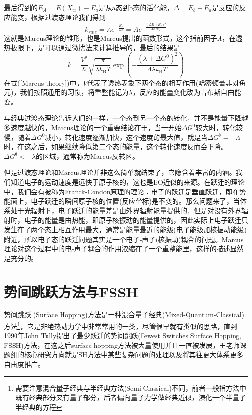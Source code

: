 \documentclass[12pt,a4paper,openany,twoside]{book}
\numberwithin{equation}{section}
\begin{document}
        最后得到的$E_A=E\left(X_{\mathrm{tr}}\right)-E_a$是从a态到b态的活化能，$\Delta = E_b-E_a$是反应的反应能变，根据过渡态理论我们得到
        \begin{equation*}
          k_{r a t e}=A e^{-\frac{E_{A}}{k T}}=A e^{-\frac{\left(\Delta E+E_{r}\right)^{2}}{4 k T E_{r}}}
        \end{equation*}
        这就是Marcus理论的雏形，也是Marcus提出的函数形式，这个指前因子$A$，在透热极限下，是可以通过微扰法来计算推导的，最后的结果是
        \begin{equation}
          k=\frac{V^{2}}{\hbar} \sqrt{\frac{\pi}{\lambda k_{\mathrm{B}} T}} \exp \left(-\frac{\left(\lambda+\Delta G^{0}\right)^{2}}{4 \lambda k_{\mathrm{B}} T}\right)
          \label{Marcus theory}
        \end{equation}
        在式(\ref{Marcus theory})中，$V$代表了透热表象下两个态的相互作用(哈密顿量非对角元)，我们按照通用的习惯，将重整能记为$\lambda$，反应的能量变化改为吉布斯自由能变。

        与经典过渡态理论告诉人们的一样，一个态到另一个态的转化，并不是能量下降越多速度越快的，Marcus理论的一个重要结论在于，当一开始$\Delta G^{0}$较大时，转化较慢，随着$\Delta G^{0}$减小，转化速度逐渐加快，这个速度的最大值，就是当$\Delta G^{0} = -\Lambda$时，在这之后，如果继续降低第二个态的能量，这个转化速度反而会下降。$\Delta G^{0}< -\lambda$的区域，通常称为Marcus反转区。

        但是过渡态理论和Marcus理论并非这么简单就结束了，它隐含着丰富的内涵。我们知道电子的运动速度是远快于原子核的，这也是BO近似的来源。在跃迁的理论中，我们会有被称为Franck-Condon原理的理论：电子的跃迁是垂直跃迁，即在势能面上，电子跃迁的瞬间原子核的位置(反应坐标)是不变的。那么问题来了，当体系处于光辐射下，电子跃迁的能量差是由外界辐射能量提供的，但是对没有外界辐射时，电子的能量是由热能，即原子核振动的能量提供的，因此实际上电子跃迁只发生在了两个态上相互作用最大，通常是能量最近的能级(电子能级加核振动能级)附近，所以电子态的跃迁问题其实是一个电子-声子(核振动)耦合的问题。Marcus理论对这个过程中的电-声子耦合的作用浓缩在了一个重整能里，这样的描述显然是充分的。
      \section{势间跳跃方法与FSSH}
        势间跳跃 (Surface Hopping)方法是一种混合量子经典(Mixed-Quantum-Classical)方法\footnote{需要注意混合量子经典与半经典方法(Semi-Classical)不同，前者一般指方法中既有经典部分又有量子部分，后者偏向量子力学做经典近似，演化一个半量子半经典的方程}，它是非绝热动力学中非常常用的一类，尽管很早就有类似的思路，直到1990年John Tully提出了最少跃迁的势间跳跃(Fewest Switches Surface Hopping, FSSH)方法\cite{Tully1990}，在这之后surface hopping方法被大量使用并且一直被发展，王老师课题组的核心研究方向就是SH方法中某些复杂问题的处理以及将其往更大体系更多自由度推广。
\end{document}
